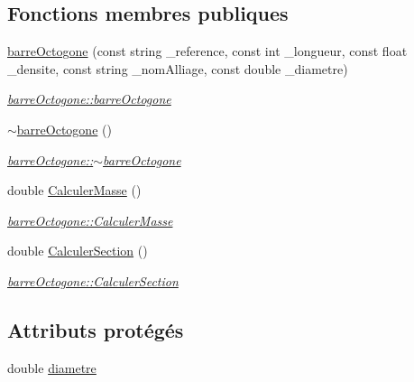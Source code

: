 \subsection*{Fonctions membres publiques}
\begin{DoxyCompactItemize}
\item 
\hyperlink{classbarre_octogone_a155858ba0e9b2b00a99c96391cb95626}{barre\+Octogone} (const string \+\_\+reference, const int \+\_\+longueur, const float \+\_\+densite, const string \+\_\+nom\+Alliage, const double \+\_\+diametre)
\begin{DoxyCompactList}\small\item\em \hyperlink{classbarre_octogone_a155858ba0e9b2b00a99c96391cb95626}{barre\+Octogone\+::barre\+Octogone} \end{DoxyCompactList}\item 
\hyperlink{classbarre_octogone_ace0c5f7ff3f012b530679e0784a5a577}{$\sim$barre\+Octogone} ()
\begin{DoxyCompactList}\small\item\em \hyperlink{classbarre_octogone_ace0c5f7ff3f012b530679e0784a5a577}{barre\+Octogone\+::$\sim$barre\+Octogone} \end{DoxyCompactList}\item 
double \hyperlink{classbarre_octogone_a1c634ed8124610f7771bd3d4b55d9893}{Calculer\+Masse} ()
\begin{DoxyCompactList}\small\item\em \hyperlink{classbarre_octogone_a1c634ed8124610f7771bd3d4b55d9893}{barre\+Octogone\+::\+Calculer\+Masse} \end{DoxyCompactList}\item 
double \hyperlink{classbarre_octogone_a11253e9fe3c969943a950d97ddd36f66}{Calculer\+Section} ()
\begin{DoxyCompactList}\small\item\em \hyperlink{classbarre_octogone_a11253e9fe3c969943a950d97ddd36f66}{barre\+Octogone\+::\+Calculer\+Section} \end{DoxyCompactList}\end{DoxyCompactItemize}
\subsection*{Attributs protégés}
\begin{DoxyCompactItemize}
\item 
double \hyperlink{classbarre_octogone_ae1673cb5bb0f18d179ddb04c17e9e59e}{diametre}
\end{DoxyCompactItemize}


